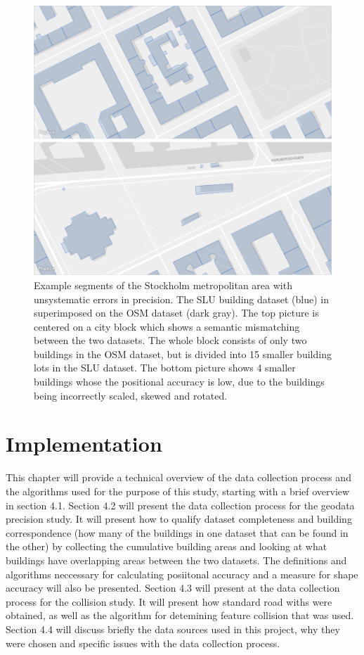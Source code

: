 \documentclass{kththesis}
\begin{document}
\begin{figure}[H]
    \centering
    \includegraphics[width=\textwidth,height=0.5\textheight,keepaspectratio]{img_map_compare}
    \caption{Example segments of the Stockholm metropolitan area with unsystematic errors in precision. The SLU building dataset (blue) in superimposed on the OSM dataset (dark gray). The top picture is centered on a city block which shows a semantic mismatching between the two datasets. The whole block consists of only two buildings in the OSM dataset, but is divided into 15 smaller building lots in the SLU dataset. The bottom picture shows 4 smaller buildings whose the positional accuracy is low, due to the buildings being incorrectly scaled, skewed and rotated.}
    \label{fig:osm-slu-map}
\end{figure}

\chapter{Implementation}

This chapter will provide a technical overview of the data collection process and the algorithms used for the purpose of this study, starting with a brief overview in section 4.1.
Section 4.2 will present the data collection process for the geodata precision study. It will present how to qualify dataset completeness and building correspondence (how many of the buildings in one dataset that can be found in the other) by collecting the cumulative building areas and looking at what buildings have overlapping areas between the two datasets.
The definitions and algorithms neccessary for calculating posiitonal accuracy and a measure for shape accuracy will also be presented.
Section 4.3 will present at the data collection process for the collision study. It will present how standard road withs were obtained, as well as the algorithm for detemining feature collision that was used.
Section 4.4 will discuss briefly the data sources used in this project, why they were chosen and specific issues with the data collection process.
\end{document}
